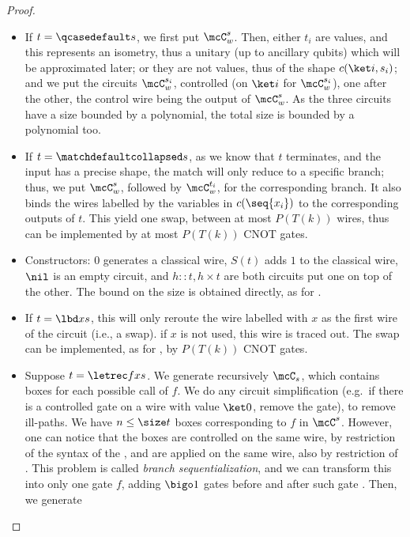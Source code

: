 \begin{proof}
  \begin{itemize}
    \item If $t = \qcasedefault s$, we first put $\mcC_w^s$. Then, either $t_i$
      are values, and this represents an isometry, thus a unitary (up to
      ancillary qubits) which will be approximated later; or they are
      not values, thus of the shape $c(\ket i, s_i)$; and we put the circuits
      $\mcC_w^{s_i}$, controlled (on $\ket i$ for $\mcC_w^{s_i}$), one after
      the other, the control wire being the output of $\mcC_w^s$. As the
      three circuits have a size bounded by a polynomial, the total size is
      bounded by a polynomial too.
    \item If $t = \matchdefaultcollapsed s$, as we know that $t$ terminates, and
      the input has a precise shape, the match will only reduce to a
      specific branch; thus, we put $\mcC_w^s$, followed by $\mcC_w^{t_i}$, for
      the corresponding branch. It also binds the wires labelled by
      the variables in $c(\seq{x_i})$ to the corresponding outputs of $t$. This
      yield one swap, between at most $P(T(k))$ wires, thus can be implemented
      by at most $P(T(k))$ CNOT gates.
    \item Constructors: $0$ generates a classical wire, $S(t)$ adds $1$ to the
      classical wire, $\nil$ is an empty circuit, and $h::t, h \times t$ are
      both circuits put one on top of the other. The bound on the size is
      obtained directly, as for \textqcase{}.
    \item If $t = \lbd x s$, this will only reroute the wire
      labelled with $x$ as the first wire of the circuit (i.e., a swap). if $x$
      is not used, this wire is traced out. The swap can be implemented, as for
      \textmatch{}, by $P(T(k))$ CNOT gates.
    \item Suppose $t = \letrec f x s$. We generate recursively $\mcC_s$, which
      contains boxes for each possible call of $f$. We do any circuit
      simplification (e.g.\ if there is a controlled gate on a wire with value
      $\ket 0$, remove the gate), to remove ill-paths. We have $n \leq \size t$
      boxes corresponding to $f$ in $\mcC^s$. However, one can notice that
      the boxes are controlled on the same wire, by restriction of the syntax
      of the \textqcase{}, and are applied on the same wire, also by restriction
      of \textletrec{}. This problem is called \emph{branch
      sequentialization}, and
      we can transform this into only one gate $f$, adding $\bigo 1$ gates
      before and after such gate \cite[Theorem 9]{HPS25}. Then, we generate

\end{itemize}
\end{proof}
